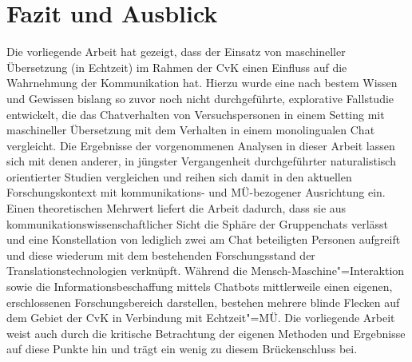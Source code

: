 
\chapter{Fazit und Ausblick} %

\label{K8} %

{

Die vorliegende Arbeit hat gezeigt, dass der Einsatz von maschineller Übersetzung (in Echtzeit) im Rahmen der CvK einen Einfluss auf die Wahrnehmung der Kommunikation hat. Hierzu wurde eine nach bestem Wissen und Gewissen bislang so zuvor noch nicht durchgeführte, explorative Fallstudie entwickelt, die das Chatverhalten von Versuchspersonen in einem Setting mit maschineller Übersetzung mit dem Verhalten in einem monolingualen Chat vergleicht.
Die Ergebnisse der vorgenommenen Analysen in dieser Arbeit lassen sich mit denen anderer, in jüngster Vergangenheit durchgeführter naturalistisch orientierter Studien vergleichen und reihen sich damit in den aktuellen Forschungskontext mit kommunikations- und MÜ-bezogener Ausrichtung ein.
Einen theoretischen Mehrwert liefert die Arbeit dadurch, dass sie aus kommunikationswissenschaftlicher Sicht die Sphäre der Gruppenchats verlässt und eine Konstellation von lediglich zwei am Chat beteiligten Personen aufgreift und diese wiederum mit dem bestehenden Forschungsstand der Translationstechnologien verknüpft. Während die Mensch-Maschine"=Interaktion sowie die Informationsbeschaffung mittels Chatbots mittlerweile einen eigenen, erschlossenen Forschungsbereich darstellen, bestehen mehrere blinde Flecken auf dem Gebiet der CvK in Verbindung mit Echtzeit"=MÜ. Die vorliegende Arbeit weist auch durch die kritische Betrachtung der eigenen Methoden und Ergebnisse auf diese Punkte hin und trägt ein wenig zu diesem Brückenschluss bei.
}
